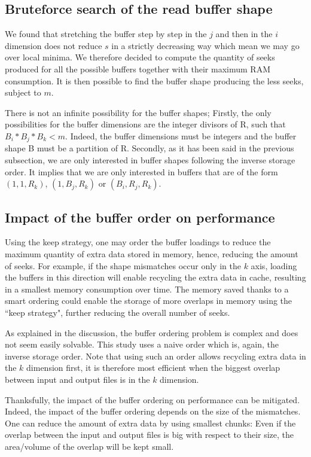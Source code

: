 \documentclass[conference]{IEEEtran}
\begin{document}
\subsection{Bruteforce search of the read buffer shape}
We found that stretching the buffer step by step in the $j$ and then in the
$i$ dimension does not reduce $s$
in a strictly decreasing way which mean we may go over local minima.
We therefore decided to compute the quantity of seeks produced for all the
possible buffers together with their maximum RAM consumption.
It is then possible to find the buffer shape producing the less seeks, subject
to $m$.

There is not an infinite possibility for the buffer shapes;
Firstly, the only possibilities for the buffer dimensions are the integer
divisors of R, such that $B_i*B_j*B_k < m$. Indeed, the buffer dimensions must
be integers and the buffer shape B must be a partition of R.
Secondly, as it has been said in the previous subsection, we are only
interested in buffer shapes following the inverse storage order. It implies that
we are only interested in buffers that are of the form $(1,1,R_k)$,
$(1,B_j,R_k)$ or $(B_i,R_j,R_k)$.

\subsection{Impact of the buffer order on performance}
Using the keep strategy, one may order the buffer loadings to reduce the maximum
quantity of extra data stored in memory, hence, reducing the amount of seeks.
For example, if the shape mismatches occur only in the $k$ axis, loading the
buffers in this direction will enable recycling the extra data in cache,
resulting in a smallest memory consumption over time.
The memory saved thanks to a smart
ordering could enable the storage of more overlaps in memory using the
``keep strategy", further reducing the overall number of seeks.

As explained in the discussion, the buffer ordering problem is complex and does
not seem easily solvable.
This study uses a naive order which is, again, the inverse storage order.
Note that using such
an order allows recycling extra data in the $k$ dimension first, it is therefore
most efficient when the biggest overlap between input and output files is in the
$k$ dimension.

Thanksfully, the impact of the buffer ordering on performance can be
mitigated. Indeed, the impact of the buffer ordering depends on the size of the
mismatches. One can reduce the amount of extra data by using smallest chunks: Even
if the overlap between the input and output files is big with respect to their
size, the area/volume of the overlap will be kept small.
\end{document}
